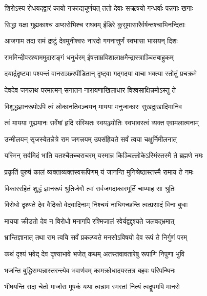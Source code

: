 \twolineshloka
{शिरोऽस्य रोधयद्द्वारं कायो नक्राद्यचूर्णयत्}
{ततो देवाः सऋषयो गन्धर्वाः पन्नगाः खगाः} %

\twolineshloka
{सिद्धा यक्षा गुह्यकाश्च अप्सरोभिश्च राघवम्}
{ईडिरे कुसुमासारैर्वर्षन्तश्चाभिनन्दिताः} %

\twolineshloka
{आजगाम तदा रामं द्रष्टुं देवमुनीश्वरः}
{नारदो गगनात्तुर्णं स्वभासा भासयन् दिशः} %

\twolineshloka
{राममिन्दीवरश्याममुदाराङ्गं धनुर्धरम्}
{ईषत्ताम्रविशालाक्षमैन्द्रास्त्राञ्चितबाहुकम्} %

\twolineshloka
{दयार्द्रदृष्ट्या पश्यन्तं वानराञ्छरपीडितान्}
{दृष्ट्वा गद्गदया वाचा भक्त्या स्तोतुं प्रचक्रमे} %


\twolineshloka
{देवदेव जगन्नाथ परमात्मन् सनातन}
{नारायणाखिलाधार विश्वसाक्षिन्नमोऽस्तु ते} %

\twolineshloka
{विशुद्धज्ञानरूपोऽपि त्वं लोकानतिवञ्चयन्}
{मायया मनुजाकारः सुखदुःखादिमानिव} %

\twolineshloka
{त्वं मायया गुह्यमानः सर्वेषां हृदि संस्थितः}
{स्वयञ्ज्योतिः स्वभावस्त्वं व्यक्त एवामलात्मनाम्} %

\twolineshloka
{उन्मीलयन् सृजस्येतन्नेत्रे राम जगत्त्रयम्}
{उपसंह्रियते सर्वं त्वया चक्षुर्निमीलनात्} %

\twolineshloka
{यस्मिन् सर्वमिदं भाति यतश्चैतच्चराचरम्}
{यस्मान्न किञ्चिल्लोकेऽस्मिंस्तस्मै ते ब्रह्मणे नमः} %

\twolineshloka
{प्रकृतिं पुरुषं कालं व्यक्ताव्यक्तस्वरूपिणम्}
{यं जानन्ति मुनिश्रेष्ठास्तस्मै रामाय ते नमः} %

\twolineshloka
{विकाररहितं शुद्धं ज्ञानरूपं श्रुतिर्जगौ}
{त्वां सर्वजगदाकारमूर्तिं चाप्याह सा श्रुतिः} %

\twolineshloka
{विरोधो दृश्यते देव वैदिको वेदवादिनाम्}
{निश्चयं नाधिगच्छन्ति त्वत्प्रसादं विना बुधाः} %

\twolineshloka
{मायया क्रीडतो देव न विरोधो मनागपि}
{रश्मिजालं रवेर्यद्वद्दृश्यते जलवद्\mbox{}भ्रमात्} %

\twolineshloka
{भ्रान्तिज्ञानात् तथा राम त्वयि सर्वं प्रकल्प्यते}
{मनसोऽविषयो देव रूपं ते निर्गुणं परम्} %

\twolineshloka
{कथं दृश्यं भवेद् देव दृश्याभावे भजेत् कथम्}
{अतस्तवावतारेषु रूपाणि निपुणा भुवि} %

\twolineshloka
{भजन्ति बुद्धिसम्पन्नास्तरन्त्येव भवार्णवम्}
{कामक्रोधादयस्तत्र बहवः परिपन्थिनः} %

\twolineshloka
{भीषयन्ति सदा चेतो मार्जारा मूषकं यथा}
{त्वन्नाम स्मरतां नित्यं त्वद्रूपमपि मानसे} %


